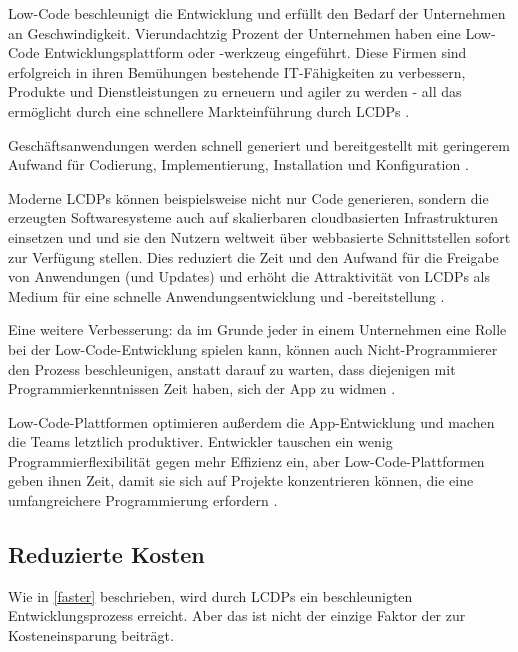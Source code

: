\documentclass[12pt]{article} %
\begin{document}
	Low-Code beschleunigt die Entwicklung und erfüllt den Bedarf der Unternehmen an Geschwindigkeit. Vierundachtzig Prozent der Unternehmen haben eine Low-Code Entwicklungsplattform oder -werkzeug eingeführt. %
	Diese Firmen sind erfolgreich in ihren Bemühungen bestehende IT-Fähigkeiten zu verbessern, Produkte und Dienstleistungen zu erneuern und agiler zu werden - all das ermöglicht durch eine schnellere Markteinführung durch LCDPs \cite{EmmaVanPelt.2019}.
	
	Geschäftsanwendungen werden schnell generiert und bereitgestellt mit geringerem Aufwand für Codierung, Implementierung, Installation und Konfiguration \cite{Kaiser.2021}.
		
	Moderne LCDPs können beispielsweise nicht nur Code generieren, sondern die erzeugten Softwaresysteme auch auf skalierbaren cloudbasierten Infrastrukturen einsetzen und und sie den Nutzern weltweit über webbasierte Schnittstellen sofort zur Verfügung stellen. Dies reduziert die Zeit und den Aufwand für die Freigabe von Anwendungen (und Updates) und erhöht die Attraktivität von LCDPs als Medium für eine schnelle Anwendungsentwicklung und -bereitstellung \cite{DiRuscio.2022}.
	
	Eine weitere Verbesserung: da im Grunde jeder in einem Unternehmen eine Rolle bei der Low-Code-Entwicklung spielen kann, können auch Nicht-Programmierer den Prozess beschleunigen, anstatt darauf zu warten, dass diejenigen mit Programmierkenntnissen Zeit haben, sich der App zu widmen \cite{Microsoft.2023}.
	
	Low-Code-Plattformen optimieren außerdem die App-Entwicklung und machen die Teams letztlich produktiver. Entwickler tauschen ein wenig Programmierflexibilität gegen mehr Effizienz ein, aber Low-Code-Plattformen geben ihnen Zeit, damit sie sich auf Projekte konzentrieren können, die eine umfangreichere Programmierung erfordern \cite{Microsoft.2023}.
	
	\subsection{Reduzierte Kosten}
	Wie in \ref{faster} beschrieben, wird durch LCDPs ein beschleunigten Entwicklungsprozess erreicht. Aber das ist nicht der einzige Faktor der zur Kosteneinsparung beiträgt.  
	
\end{document}
